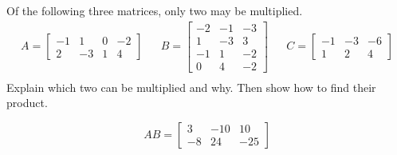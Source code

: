 
\begin{exerciseStatement}


Of the following three matrices, only two may be multiplied. 
\begin{align*} A= \left[\begin{array}{cccc}
-1 & 1 & 0 & -2 \\
2 & -3 & 1 & 4
\end{array}\right]  & & B= \left[\begin{array}{ccc}
-2 & -1 & -3 \\
1 & -3 & 3 \\
-1 & 1 & -2 \\
0 & 4 & -2
\end{array}\right]  & & C= \left[\begin{array}{ccc}
-1 & -3 & -6 \\
1 & 2 & 4
\end{array}\right]  \\ \end{align*}
             Explain which two can be multiplied and why. Then show how to find their product.


\end{exerciseStatement}
    
\begin{exerciseAnswer} 
\[AB= \left[\begin{array}{ccc}
3 & -10 & 10 \\
-8 & 24 & -25
\end{array}\right] \]
\end{exerciseAnswer}
    

